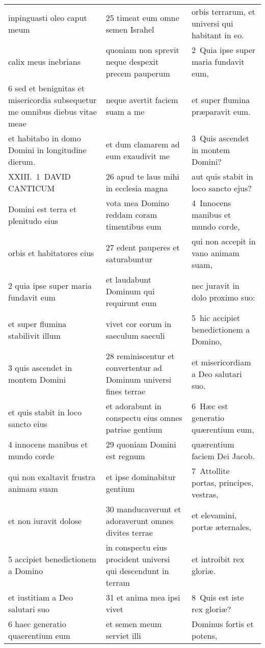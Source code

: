 \documentclass{article}
\begin{document}
\begin{longtable}{@{}p{}p{}p{}@{}}
inpinguasti oleo caput meum	&	25 timeat eum omne semen Israhel	&	orbis terrarum, et universi qui habitant in eo.	\\
calix meus inebrians	&	quoniam non sprevit neque despexit precem pauperum	&	2 Quia ipse super maria fundavit eum,	\\
6 sed et benignitas et misericordia subsequetur me omnibus diebus vitae meae	&	neque avertit faciem suam a me	&	et super flumina præparavit eum.	\\
et habitabo in domo Domini in longitudine dierum.	&	et dum clamarem ad eum exaudivit me	&	3 Quis ascendet in montem Domini?	\\
XXIII. 1 DAVID CANTICUM	&	26 apud te laus mihi in ecclesia magna	&	aut quis stabit in loco sancto ejus?	\\
Domini est terra et plenitudo eius	&	vota mea Domino reddam coram timentibus eum	&	4 Innocens manibus et mundo corde,	\\
orbis et habitatores eius	&	27 edent pauperes et saturabuntur	&	qui non accepit in vano animam suam,	\\
2 quia ipse super maria fundavit eum	&	et laudabunt Dominum qui requirunt eum	&	nec juravit in dolo proximo suo:	\\
et super flumina stabilivit illum	&	vivet cor eorum in saeculum saeculi	&	5 hic accipiet benedictionem a Domino,	\\
3 quis ascendet in montem Domini	&	28 reminiscentur et convertentur ad Dominum universi fines terrae	&	et misericordiam a Deo salutari suo.	\\
et quis stabit in loco sancto eius	&	et adorabunt in conspectu eius omnes patriae gentium	&	6 Hæc est generatio quærentium eum,	\\
4 innocens manibus et mundo corde	&	29 quoniam Domini est regnum	&	quærentium faciem Dei Jacob.	\\
qui non exaltavit frustra animam suam	&	et ipse dominabitur gentium	&	7 Attollite portas, principes, vestras,	\\
et non iuravit dolose	&	30 manducaverunt et adoraverunt omnes divites terrae	&	et elevamini, portæ æternales,	\\
5 accipiet benedictionem a Domino	&	in conspectu eius procident universi qui descendunt in terram	&	et introibit rex gloriæ.	\\
et iustitiam a Deo salutari suo	&	31 et anima mea ipsi vivet	&	8 Quis est iste rex gloriæ?	\\
6 haec generatio quaerentium eum	&	et semen meum serviet illi	&	Dominus fortis et potens,	\\

\end{longtable}
\end{document}
